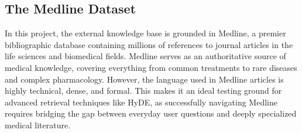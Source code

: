 \subsection{The Medline Dataset}
In this project, the external knowledge base is grounded in Medline, a premier bibliographic database containing millions of references to journal articles in the life sciences and biomedical fields. Medline serves as an authoritative source of medical knowledge, covering everything from common treatments to rare diseases and complex pharmacology. However, the language used in Medline articles is highly technical, dense, and formal. This makes it an ideal testing ground for advanced retrieval techniques like HyDE, as successfully navigating Medline requires bridging the gap between everyday user questions and deeply specialized medical literature.
